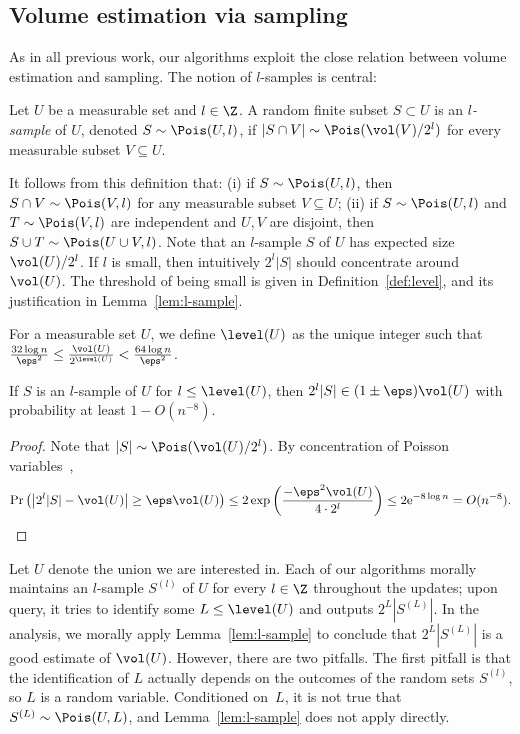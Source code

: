 \subsection{Volume estimation via sampling}
As in all previous work, our algorithms exploit the close relation between volume estimation and sampling. The notion of $l$-samples is central:
%
\begin{definition}[$l$-sample]
    Let $U$ be a measurable set and $l \in \Z$. A random finite subset $S \subset U$ is an \emph{$l$-sample} of $U$, denoted $S \sim \Pois(U,l)$, if $|S \cap V| \sim \Pois(\vol(V)/2^l)$ for every measurable subset $V \subseteq U$.
\end{definition}
%
It follows from this definition that: (i) if $S \sim \Pois(U,l)$, then $S \cap V \sim \Pois(V,l)$ for any measurable subset $V \subseteq U$; (ii) if $S \sim \Pois(U,l)$ and $T \sim \Pois(V,l)$ are independent and $U,V$ are disjoint, then $S \cup T \sim \Pois(U \cup V, l)$.
%
Note that an $l$-sample $S$ of $U$ has expected size $\vol(U)/2^l$.
If $l$ is small, then intuitively $2^l |S|$ should concentrate around $\vol(U)$. The threshold of being small is given in Definition~\ref{def:level}, and its justification in Lemma~\ref{lem:l-sample}.
\begin{definition}[level]
    \label{def:level}
    For a measurable set $U$, we define $\level(U)$ as the unique integer such that $\frac{32 \log n}{\eps^2} \leq \frac{\vol(U)}{2^{\level(U)}} < \frac{64 \log n}{\eps^2}$.
\end{definition}
%
\begin{lemma}
    \label{lem:l-sample}
    If $S$ is an $l$-sample of $U$ for $l \leq \level(U)$, then $2^l |S| \in (1\pm\eps) \vol(U)$ with probability at least $1 - O(n^{-8})$.
\end{lemma}
%
\begin{proof}
    Note that $|S| \sim \Pois(\vol(U)/2^l)$. By concentration of Poisson variables~\cite{Canonne19},
    \[
        \Pr \left( \left| 2^l |S| - \vol(U) \right| \geq \eps \vol(U) \right)
        \leq 2\exp\left( \frac{-\eps^2 \vol(U)}{4 \cdot 2^l} \right)
        \leq 2\mathrm{e}^{-8 \log n} = O(n^{-8}).\qedhere
    \]
    \aftermath
\end{proof}
%
Let $U$ denote the union we are interested in. Each of our algorithms morally maintains an $l$-sample $S^{(l)}$ of $U$ for every $l \in \Z$ throughout the updates; upon query, it tries to identify some $L \leq \level(U)$ and outputs $2^L |S^{(L)}|$. In the analysis, we morally apply Lemma~\ref{lem:l-sample} to conclude that $2^L |S^{(L)}|$ is a good estimate of $\vol(U)$. However, there are two pitfalls. The first pitfall is that the identification of $L$ actually depends on the outcomes of the random sets $S^{(l)}$, so $L$ is a random variable. Conditioned on~$L$, it is not true that $S^{(L)} \sim \Pois(U, L)$, and Lemma~\ref{lem:l-sample} does not apply directly.
